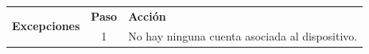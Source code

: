 \begin{table}[H]
\begin{tabularx}{\textwidth}{|c|c|X|}
    \hline
    \multirow{2}{*}{\textbf{Excepciones}}      & \textbf{Paso}                                                                                                                       & \textbf{Acción}                                                                                                                         \\
    \cline{2-3}
                                               & 1                                                                                                                                   & \multicolumn{1}{L|}{No hay ninguna cuenta asociada al dispositivo.}                                                                     \\
    \hline
  \end{tabularx}
\end{table}
